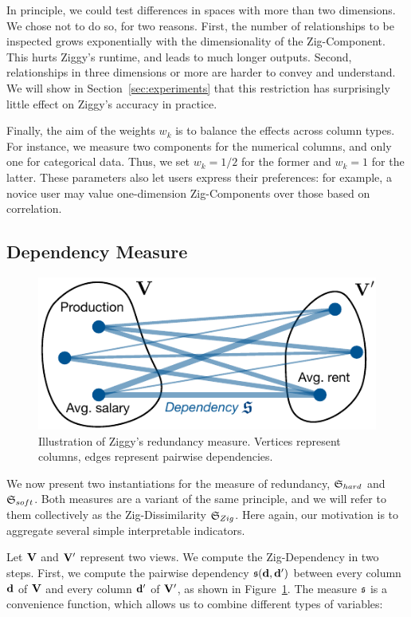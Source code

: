 In principle, we could test differences in spaces with more than two
dimensions.  We chose not to do so, for two reasons. First, the number of
relationships to be inspected grows exponentially with the dimensionality of
the Zig-Component. This hurts Ziggy's runtime, and leads to much longer
outputs. Second, relationships in three dimensions or more are harder to convey
and understand. We will show in Section~\ref{sec:experiments} that this
restriction has surprisingly little effect on Ziggy's accuracy in practice.

Finally, the aim of the weights $w_k$ is to balance the effects across column
types. For instance, we measure two components for the numerical columns, and
only one for categorical data.  Thus, we set $w_k = 1/2$ for the former and
$w_k = 1$ for the latter.  These parameters also let users express their
preferences: for example, a novice user may value one-dimension Zig-Components
over those based on correlation.


\subsection{Dependency Measure}
\label{sec:dependency}
\begin{figure}
  \centering
  \includegraphics[width=0.8\columnwidth]{Figures/Redundancy}
  \caption{Illustration of Ziggy's redundancy measure. Vertices represent
  columns, edges represent pairwise dependencies.}
  \label{pic:redundanct}
\end{figure}
We now present two instantiations for the measure of redundancy,
$\mathfrak{S}_{hard}$ and $\mathfrak{S}_{soft}$.  Both measures are a variant of the same
principle, and we will refer to them collectively as the Zig-Dissimilarity
$\mathfrak{S}_{Zig}$. Here again, our motivation is to aggregate several simple
interpretable indicators.

Let  $\mathbf{V}$ and $\mathbf{V}'$ represent two views. We compute the Zig-Dependency
in two steps. First, we compute the pairwise dependency $\mathfrak{s}(\mathbf{d},
\mathbf{d}')$ between every column $\mathbf{d}$ of  $\mathbf{V}$ and every column $\mathbf{d}'$
of $\mathbf{V}'$, as shown in Figure~\ref{pic:redundanct}. The measure $\mathfrak{s}$ is
a convenience function, which allows us to combine different types of
variables:

